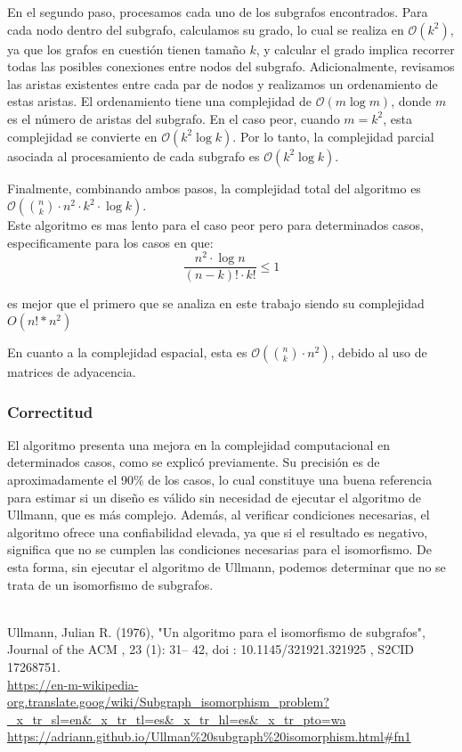 \documentclass[12pt,a4paper]{article}
\begin{document}
En el segundo paso, procesamos cada uno de los subgrafos encontrados. Para cada nodo dentro del subgrafo, calculamos su grado, lo cual se realiza en \( \mathcal{O}(k^2) \), ya que los grafos en cuestión tienen tamaño \( k \), y calcular el grado implica recorrer todas las posibles conexiones entre nodos del subgrafo. Adicionalmente, revisamos las aristas existentes entre cada par de nodos y realizamos un ordenamiento de estas aristas. El ordenamiento tiene una complejidad de \( \mathcal{O}(m \log m) \), donde \( m \) es el número de aristas del subgrafo. En el caso peor, cuando \( m = k^2 \), esta complejidad se convierte en \( \mathcal{O}(k^2 \log k) \). Por lo tanto, la complejidad parcial asociada al procesamiento de cada subgrafo es \( \mathcal{O}(k^2 \log k) \).

Finalmente, combinando ambos pasos, la complejidad total del algoritmo es \( \mathcal{O}\left(\binom{n}{k} \cdot n^2 \cdot k^2 \cdot \log k\right) \).
\\
Este algoritmo es mas lento para el caso peor pero para determinados casos, especificamente para los casos en que:
\[
\frac{n^2 \cdot \log n}{(n-k)! \cdot k!} \leq 1
\]

es mejor que el primero que se analiza en este trabajo siendo su complejidad $O(n!*n^2)$


En cuanto a la complejidad espacial, esta es \( \mathcal{O}\left(\binom{n}{k} \cdot n^2\right) \), debido al uso de matrices de adyacencia.

\subsubsection{Correctitud}

El algoritmo presenta una mejora en la complejidad computacional en determinados casos, como se explicó previamente. Su precisión es de aproximadamente el 90\% de los casos, lo cual constituye una buena referencia para estimar si un diseño es válido sin necesidad de ejecutar el algoritmo de Ullmann, que es más complejo. Además, al verificar condiciones necesarias, el algoritmo ofrece una confiabilidad elevada, ya que si el resultado es negativo, significa que no se cumplen las condiciones necesarias para el isomorfismo. De esta forma, sin ejecutar el algoritmo de Ullmann, podemos determinar que no se trata de un isomorfismo de subgrafos.



\\
Ullmann, Julian R. (1976), "Un algoritmo para el isomorfismo de subgrafos", Journal of the ACM , 23 (1): 31– 42, doi : 10.1145/321921.321925 , S2CID  17268751.
\\
\url{https://en-m-wikipedia-org.translate.goog/wiki/Subgraph_isomorphism_problem?_x_tr_sl=en&_x_tr_tl=es&_x_tr_hl=es&_x_tr_pto=wa}
\\
\url {https://adriann.github.io/Ullman%20subgraph%20isomorphism.html#fn1}
\\
\end{document}
